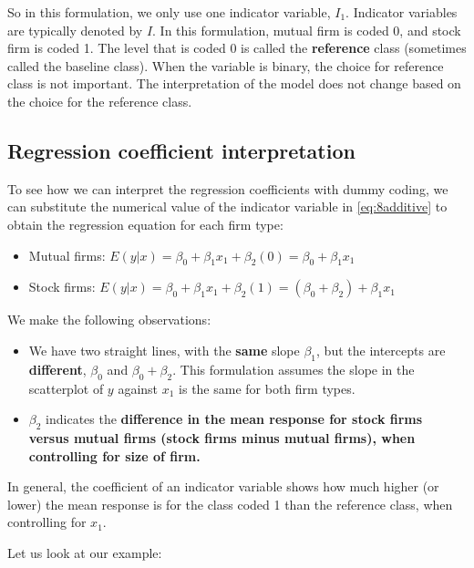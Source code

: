 \documentclass[
]{book}
\providecommand{\tightlist}{%
  \setlength{\itemsep}{0pt}\setlength{\parskip}{0pt}}
\begin{document}
So in this formulation, we only use one indicator variable, \(I_1\). Indicator variables are typically denoted by \(I\). In this formulation, mutual firm is coded 0, and stock firm is coded 1. The level that is coded 0 is called the \textbf{reference} class (sometimes called the baseline class). When the variable is binary, the choice for reference class is not important. The interpretation of the model does not change based on the choice for the reference class.

\hypertarget{regression-coefficient-interpretation}{%
\subsection{Regression coefficient interpretation}\label{regression-coefficient-interpretation}}

To see how we can interpret the regression coefficients with dummy coding, we can substitute the numerical value of the indicator variable in \eqref{eq:8additive} to obtain the regression equation for each firm type:

\begin{itemize}
\item
  Mutual firms: \(E(y|x) = \beta_0 + \beta_1x_1 +\beta_2(0) = \beta_0 + \beta_1x_1\)
\item
  Stock firms: \(E(y|x) = \beta_0 + \beta_1x_1 + \beta_2(1) = (\beta_0+\beta_2) + \beta_1x_1\)
\end{itemize}

We make the following observations:

\begin{itemize}
\tightlist
\item
  We have two straight lines, with the \textbf{same} slope \(\beta_1\), but the intercepts are \textbf{different}, \(\beta_0\) and \(\beta_0 + \beta_2\). This formulation assumes the slope in the scatterplot of \(y\) against \(x_1\) is the same for both firm types.
\item
  \(\beta_2\) indicates the \textbf{difference in the mean response for stock firms versus mutual firms (stock firms minus mutual firms), when controlling for size of firm.}
\end{itemize}

In general, the coefficient of an indicator variable shows how much higher (or lower) the mean response is for the class coded 1 than the reference class, when controlling for \(x_1\).

Let us look at our example:
\end{document}
